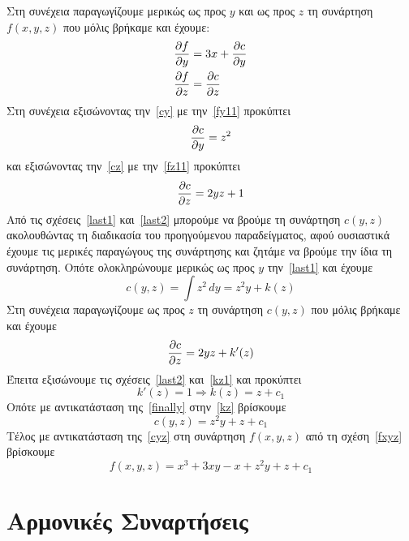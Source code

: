 \begin{solution}
\begin{description}
\begin{equation}
      \end{equation}
      Στη συνέχεια παραγωγίζουμε μερικώς ως προς $y$ και ως προς $z$  
      τη συνάρτηση $f(x,y,z)$ που μόλις βρήκαμε και έχουμε:
      \begin{align}
        \pdv{f}{y} &= 3x + \pdv{c}{y} \label{cy} \\
        \pdv{f}{z} &= \pdv{c}{z} \label{cz}
      \end{align}
      Στη συνέχεια εξισώνοντας την~\eqref{cy} με την~\eqref{fy11} προκύπτει 
      \begin{equation}
        \pdv{c}{y} = z^{2} \label{last1}
      \end{equation}
      και εξισώνοντας την~\eqref{cz} με την~\eqref{fz11} προκύπτει
      \begin{equation}
        \pdv{c}{z} = 2yz+1 \label{last2}
      \end{equation}
      Από τις σχέσεις~\eqref{last1} και~\eqref{last2} μπορούμε να βρούμε τη συνάρτηση 
      $ c(y,z) $ ακολουθώντας τη διαδικασία του προηγούμενου παραδείγματος, αφού 
      ουσιαστικά έχουμε τις μερικές παραγώγους της συνάρτησης και ζητάμε 
      να βρούμε την ίδια τη συνάρτηση. Οπότε ολοκληρώνουμε μερικώς ως προς 
      $y$ την~\eqref{last1} και έχουμε
      \begin{equation}
        c(y,z) = \int z^{2} \,{dy} = z^{2}y + k(z) \label{kz} 
      \end{equation} 
      Στη συνέχεια παραγωγίζουμε ως προς $z$ τη συνάρτηση $ c(y,z) $ που μόλις βρήκαμε 
      και έχουμε
      \begin{equation}
        \pdv{c}{z} = 2yz + k'(z) \label{kz1}
      \end{equation} 
      Έπειτα εξισώνουμε τις σχέσεις~\eqref{last2} και~\eqref{kz1} και προκύπτει 
      \[
        k'(z) = 1 \Rightarrow k(z) = z + c_{1} \label{finally}
      \] 
      Οπότε με αντικατάσταση της~\eqref{finally} στην~\eqref{kz} βρίσκουμε 
      \begin{equation}
        c(y,z) = z^{2}y+z + c_{1} \label{cyz}
      \end{equation}
      Τέλος με αντικατάσταση της~\eqref{cyz} στη συνάρτηση $ f(x,y,z) $ από τη 
      σχέση~\eqref{fxyz} βρίσκουμε
      \[
        f(x,y,z) = x^{3}+3xy-x+z^{2}y+z+ c_{1} 
      \] 
  \end{description}
\end{solution}


\section{Αρμονικές Συναρτήσεις}

